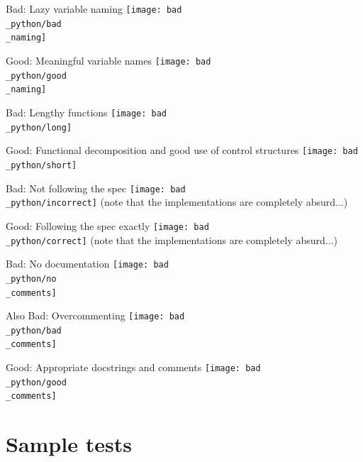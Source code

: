 \documentclass[week2]{csse1001}
\begin{document}
\begin{topic}{Bad: Lazy variable naming}
\texttt{[image: bad\\\_python/bad\\\_naming]}
\end{topic}

\begin{topic}{Good: Meaningful variable names}
\texttt{[image: bad\\\_python/good\\\_naming]}
\end{topic}

\begin{topic}{Bad: Lengthy functions}
\texttt{[image: bad\\\_python/long]}
\end{topic}

\begin{topic}{Good: Functional decomposition and good use of control structures}
\texttt{[image: bad\\\_python/short]}
\end{topic}

\begin{topic}{Bad: Not following the spec}
\texttt{[image: bad\\\_python/incorrect]}
(note that the implementations are completely absurd...)
\end{topic}

\begin{topic}{Good: Following the spec exactly}
\texttt{[image: bad\\\_python/correct]}
(note that the implementations are completely absurd...)
\end{topic}

\begin{topic}{Bad: No documentation}
\texttt{[image: bad\\\_python/no\\\_comments]}
\end{topic}

\begin{topic}{Also Bad: Overcommenting}
\texttt{[image: bad\\\_python/bad\\\_comments]}
\end{topic}

\begin{topic}{Good: Appropriate docstrings and comments}
\texttt{[image: bad\\\_python/good\\\_comments]}
\end{topic}

\section{Sample tests}
\end{document}
